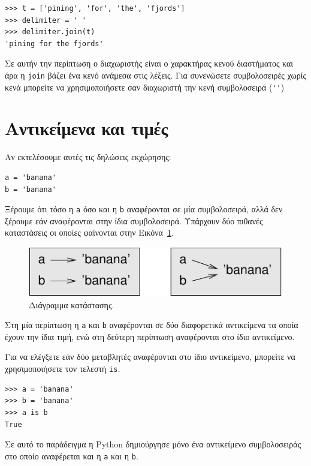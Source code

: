 \documentclass[10pt]{book}
\begin{document}
\begin{verbatim}
>>> t = ['pining', 'for', 'the', 'fjords']
>>> delimiter = ' '
>>> delimiter.join(t)
'pining for the fjords'
\end{verbatim}
%
Σε αυτήν την περίπτωση ο διαχωριστής είναι ο χαρακτήρας κενού διαστήματος και άρα η {\tt join} βάζει ένα κενό ανάμεσα στις λέξεις. Για συνενώσετε συμβολοσειρές χωρίς κενά μπορείτε να χρησιμοποιήσετε σαν διαχωριστή την κενή συμβολοσειρά (\verb"''") 


\section{Αντικείμενα και τιμές}

Αν εκτελέσουμε αυτές τις δηλώσεις εκχώρησης:

\begin{verbatim}
a = 'banana'
b = 'banana'
\end{verbatim}
%

Ξέρουμε ότι τόσο η {\tt a} όσο και η {\tt b} αναφέρονται σε μία συμβολοσειρά, αλλά δεν ξέρουμε εάν αναφέρονται στην ίδια συμβολοσειρά. Υπάρχουν δύο πιθανές καταστάσεις οι οποίες φαίνονται στην Εικόνα~\ref{fig.list1}.

\begin{figure}
\centerline
{\includegraphics[scale=0.8]{figs/list1.pdf}}
 \caption{Διάγραμμα κατάστασης.} 
\label{fig.list1}
\end{figure}


Στη μία περίπτωση η {\tt a} και {\tt b} αναφέρονται σε δύο διαφορετικά αντικείμενα τα οποία έχουν την ίδια τιμή, ενώ στη δεύτερη περίπτωση αναφέρονται στο ίδιο αντικείμενο.

Για να ελέγξετε εάν δύο μεταβλητές αναφέρονται στο ίδιο αντικείμενο, μπορείτε να χρησιμοποιήσετε τον τελεστή {\tt is}.

\begin{verbatim}
>>> a = 'banana'
>>> b = 'banana'
>>> a is b
True
\end{verbatim}
%

Σε αυτό το παράδειγμα η Python δημιούργησε μόνο ένα αντικείμενο συμβολοσειράς στο οποίο αναφέρεται και η {\tt a} και η {\tt b}.
\end{document}
